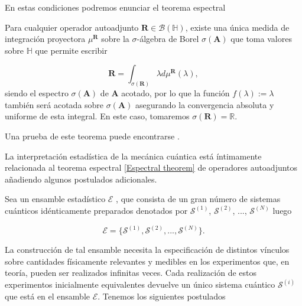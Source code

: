  En estas condiciones podremos enunciar el teorema espectral \cite[p.~233]{HoracioI}\cite[p.~60]{ HeinzPetruccione} 
 
 \begin{theorem}
 \label{Espectral theorem}
 Para cualquier operador autoadjunto $\mathbf{R} \in \mathcal{B} (\mathbb{H})$, existe una única medida de integración proyectora $\mu^{\mathbf{R}}$ sobre la $\sigma$-álgebra de Borel $\sigma(\mathbf{A})$ que toma valores sobre $\mathbb{H}$ que permite escribir
 
 \begin{equation}
     \mathbf{R} = \int_{\sigma(\mathbf{R})} \lambda d\mu^{\mathbf{R}}(\lambda)   ,
 \end{equation}
siendo el espectro $\sigma(\mathbf{A})$ de $\mathbf{A}$ acotado, por lo que la función $f(\lambda) := \lambda$ también será acotada sobre $\sigma(\mathbf{A})$ asegurando la convergencia absoluta y uniforme de esta integral. En este caso, tomaremos $\sigma(\mathbf{R}) = \mathds{R}$.
 \end{theorem}
 Una prueba de este teorema puede encontrarse 
\cite[p.~141]{BCHallp}.

La interpretación estadística de la mecánica cuántica está íntimamente relacionada al teorema espectral \ref{Espectral theorem} de operadores autoadjuntos añadiendo algunos postulados adicionales.

Sea un ensamble estadístico $\mathcal{E}$ , que consista de un gran número de sistemas cuánticos idénticamente preparados denotados por $\mathcal{S}^{(1)}$,  $\mathcal{S}^{(2)}$, ...,  $\mathcal{S}^{(N)}$ luego

\begin{equation}
    \mathcal{E} = \{\mathcal{S}^{(1)},\mathcal{S}^{(2)},...,\mathcal{S}^{(N)}\}.
\end{equation}
 
 La construcción de tal ensamble necesita la especificación de distintos vínculos sobre cantidades físicamente relevantes y medibles en los experimentos que, en teoría, pueden ser realizados infinitas veces. 
 Cada realización de estos experimentos inicialmente equivalentes devuelve un único sistema cuántico $\mathcal{S}^{(i)}$ que está en el ensamble $\mathcal{E}$. Tenemos los siguientes postulados
 
